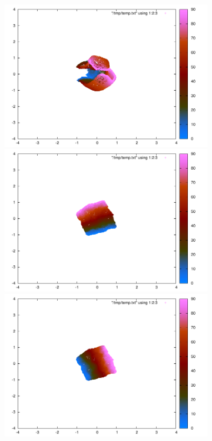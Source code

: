 \begin{figure}
\begin{subfigure}[b]{0.49 \textwidth}
\includegraphics[scale=0.5,trim = 120 100 130 70, clip]{./figures/slow/drlim2.pdf}\\
\includegraphics[scale=0.5,trim = 120 100 130 70, clip]{./figures/slow/drlim3.pdf} 
\includegraphics[scale=0.5,trim = 120 100 130 70, clip]{./figures/slow/drlim4.pdf}
        \caption{}
        \label{fig:drlim} 
\end{subfigure}


\end{figure}
